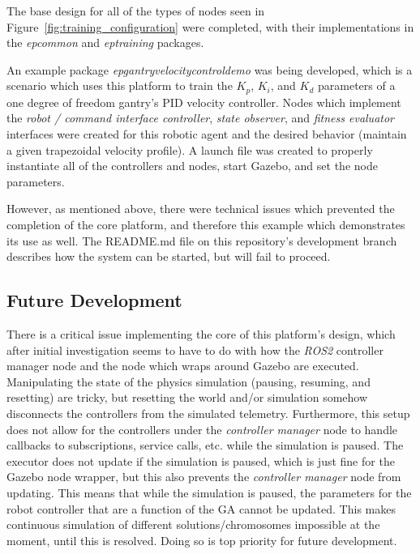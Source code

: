 \documentclass[conference]{IEEEtran}
\begin{document}
	The base design for all of the types of nodes seen in Figure~\ref{fig:training_configuration} were completed, with their implementations in the \textit{ep\textunderscore common} and \textit{ep\textunderscore training} packages.

	An example package \textit{ep\textunderscore gantry\textunderscore velocity\textunderscore control\textunderscore demo} was being developed, which is a scenario which uses this platform to train the $K_p$, $K_i$, and $K_d$ parameters of a one degree of freedom gantry's PID velocity controller. Nodes which implement the \textit{robot / command interface controller}, \textit{state observer}, and \textit{fitness evaluator} interfaces were created for this robotic agent and the desired behavior (maintain a given trapezoidal velocity profile). A launch file was created to properly instantiate all of the controllers and nodes, start Gazebo, and set the node parameters.

	However, as mentioned above, there were technical issues which prevented the completion of the core platform, and therefore this example which demonstrates its use as well. The README.md file \cite{git-repo} on this repository's development branch describes how the system can be started, but will fail to proceed.

	\subsection{Future Development}

	There is a critical issue implementing the core of this platform's design, which after initial investigation seems to have to do with how the \textit{ROS2} controller manager node and the node which wraps around Gazebo are executed. Manipulating the state of the physics simulation (pausing, resuming, and resetting) are tricky, but resetting the world and/or simulation somehow disconnects the controllers from the simulated telemetry. Furthermore, this setup does not allow for the controllers under the \textit{controller manager} node to handle callbacks to subscriptions, service calls, etc. while the simulation is paused. The executor does not update if the simulation is paused, which is just fine for the Gazebo node wrapper, but this also prevents the \textit{controller manager} node from updating. This means that while the simulation is paused, the parameters for the robot controller that are a function of the \ac{GA} cannot be updated. This makes continuous simulation of different solutions/chromosomes impossible at the moment, until this is resolved. Doing so is top priority for future development.
\end{document}
